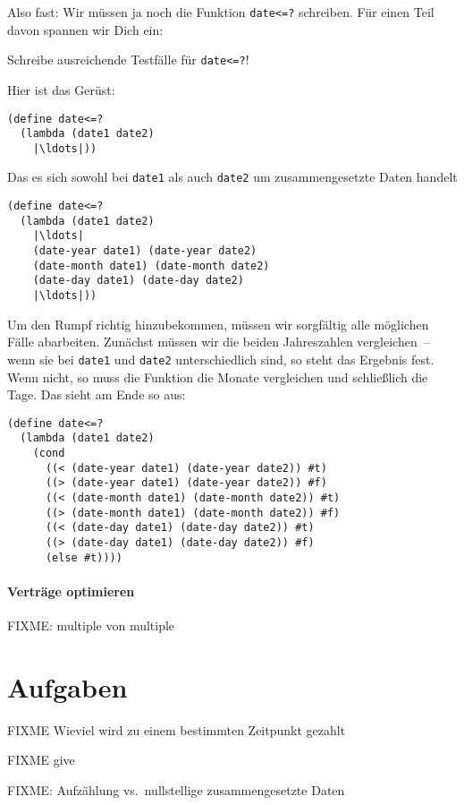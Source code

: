 Also fast: Wir müssen ja noch die Funktion \lstinline{date<=?}
schreiben.  Für einen Teil davon spannen wir Dich ein:
%
\begin{aufgabe}
  Schreibe ausreichende Testfälle für \lstinline{date<=?}!
\end{aufgabe}
%
Hier ist das Gerüst:
%
\begin{lstlisting}
(define date<=?
  (lambda (date1 date2)
    |\ldots|))
\end{lstlisting}    
%
Das es sich sowohl bei \lstinline{date1} als auch \lstinline{date2} um
zusammengesetzte Daten handelt
%
\begin{lstlisting}
(define date<=?
  (lambda (date1 date2)
    |\ldots|
    (date-year date1) (date-year date2)
    (date-month date1) (date-month date2)
    (date-day date1) (date-day date2)
    |\ldots|))
\end{lstlisting}    
%
Um den Rumpf richtig hinzubekommen, müssen wir sorgfältig alle
möglichen Fälle abarbeiten.  Zunächst müssen wir die beiden
Jahreszahlen vergleichen~-- wenn sie bei \lstinline{date1} und
\lstinline{date2} unterschiedlich sind, so steht das Ergebnis fest.
Wenn nicht, so muss die Funktion die Monate vergleichen und
schließlich die Tage.  Das sieht am Ende so aus:
%
\begin{lstlisting}
(define date<=?
  (lambda (date1 date2)
    (cond
      ((< (date-year date1) (date-year date2)) #t)
      ((> (date-year date1) (date-year date2)) #f)
      ((< (date-month date1) (date-month date2)) #t)
      ((> (date-month date1) (date-month date2)) #f)
      ((< (date-day date1) (date-day date2)) #t)
      ((> (date-day date1) (date-day date2)) #f)
      (else #t))))
\end{lstlisting}
    
\paragraph{Verträge optimieren}

\begin{aufgabe}
  FIXME: multiple von multiple
\end{aufgabe}

\section*{Aufgaben}

\begin{aufgabe}
  FIXME Wieviel wird zu einem bestimmten Zeitpunkt gezahlt
\end{aufgabe}

  
\begin{aufgabe}\label{aufgabe:give}
  FIXME give
\end{aufgabe}

\begin{aufgabe}\label{aufgabe:aufzaehlung-vs-nullstellig}
  FIXME: Aufzählung vs.\ nullstellige zusammengesetzte Daten
\end{aufgabe}




